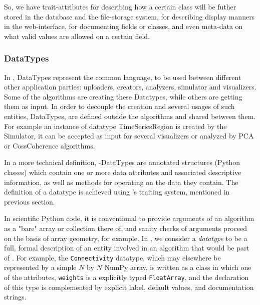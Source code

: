 So, we have trait-attributes for describing how a certain class will be futher stored in the database and the file-storage system,
for describing display manners in the web-interface, for documenting fields or classes, 
and even meta-data on what valid values are allowed on a certain field.

	\subsubsection{DataTypes}

In \TVB, DataTypes represent the common language, to be used between different other application parties: 
uploaders, creators, analyzers, simulator and visualizers.
Some of the algorithms are creating these Datatypes, while others are getting them as input. 
In order to decouple the creation and several usages of such entities, DataTypes, are defined outside the algorithms 
and shared between them. For example an instance of datatype TimeSeriesRegion is created by the Simulator, 
it can be accepted as input for several visualizers or analyzed by PCA or CossCoherence algorithms.

In a more technical definition, \TVB-DataTypes are annotated structures (Python classes) which
contain one or more data attributes and associated descriptive information, as
well as methods for operating on the data they contain. The definition of a
datatype is achieved using \TVB's traiting system, mentioned in previous section.

In scientific Python code, it is conventional to provide arguments
of an algorithm as a "bare" array or collection there of, and sanity
checks of arguments proceed on the basis of array geometry, for example.
In \TVB, we consider a \textit{datatype} to be a full, formal description of 
an entity involved in an algorithm that would be part of \TVB. 
For example, the \texttt{Connectivity} datatype, which may elsewhere
be represented by a simple $N$ by $N$ NumPy array, is written as a class
in which one of the attributes, \texttt{weights} is a explicitly typed 
\texttt{FloatArray}, and the declaration of this type is complemented by
explicit label, default values, and documentation strings. 

